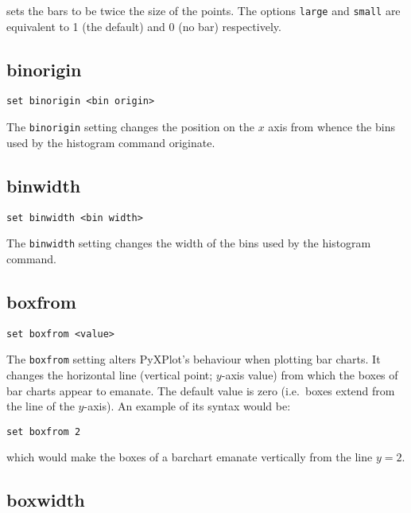 \noindent sets the bars to be twice the size of the points.  The options {\tt large} and
{\tt small} are equivalent to 1 (the default) and 0 (no bar) respectively.


\subsection{binorigin}

\begin{verbatim}
set binorigin <bin origin>
\end{verbatim}

The {\tt binorigin} setting changes the position on the $x$ axis from whence
the bins used by the histogram command originate.


\subsection{binwidth}

\begin{verbatim}
set binwidth <bin width>
\end{verbatim}

The {\tt binwidth} setting changes the width of the bins used by the histogram
command.


\subsection{boxfrom}

\begin{verbatim}
set boxfrom <value>
\end{verbatim}

The {\tt boxfrom} setting alters PyXPlot's behaviour when plotting bar charts.
It changes the horizontal line (vertical point; $y$-axis value) from which the
boxes of bar charts appear to emanate.  The default value is zero (i.e.\ boxes
extend from the line of the $y$-axis). An example of its syntax would be:

\begin{verbatim}
set boxfrom 2
\end{verbatim}

\noindent which would make the boxes of a barchart emanate vertically from the line $y=2$.


\subsection{boxwidth}

